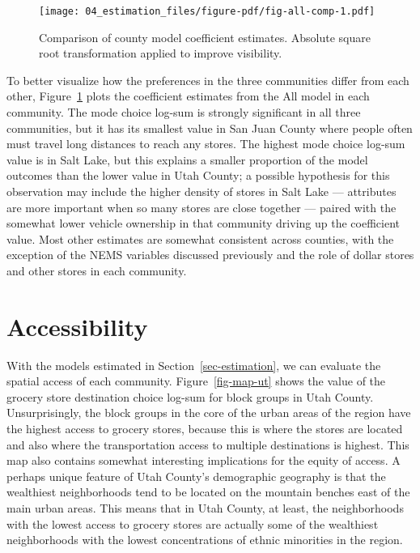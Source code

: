 \documentclass[
  letterpaper,
  DIV=11,
  numbers=noendperiod]{scrreport}
\begin{document}
\begin{figure}[t]

{\centering \texttt{[image: 04\_estimation\_files/figure-pdf/fig-all-comp-1.pdf]}

}

\caption{\label{fig-all-comp}Comparison of county model coefficient
estimates. Absolute square root transformation applied to improve
visibility.}

\end{figure}

To better visualize how the preferences in the three communities differ
from each other, Figure~\ref{fig-all-comp} plots the coefficient
estimates from the All model in each community. The mode choice log-sum
is strongly significant in all three communities, but it has its
smallest value in San Juan County where people often must travel long
distances to reach any stores. The highest mode choice log-sum value is
in Salt Lake, but this explains a smaller proportion of the model
outcomes than the lower value in Utah County; a possible hypothesis for
this observation may include the higher density of stores in Salt Lake
--- attributes are more important when so many stores are close together
--- paired with the somewhat lower vehicle ownership in that community
driving up the coefficient value. Most other estimates are somewhat
consistent across counties, with the exception of the NEMS variables
discussed previously and the role of dollar stores and other stores in
each community.

\hypertarget{sec-access}{%
\section{Accessibility}\label{sec-access}}

With the models estimated in Section~\ref{sec-estimation}, we can
evaluate the spatial access of each community. Figure~\ref{fig-map-ut}
shows the value of the grocery store destination choice log-sum for
block groups in Utah County. Unsurprisingly, the block groups in the
core of the urban areas of the region have the highest access to grocery
stores, because this is where the stores are located and also where the
transportation access to multiple destinations is highest. This map also
contains somewhat interesting implications for the equity of access. A
perhaps unique feature of Utah County's demographic geography is that
the wealthiest neighborhoods tend to be located on the mountain benches
east of the main urban areas. This means that in Utah County, at least,
the neighborhoods with the lowest access to grocery stores are actually
some of the wealthiest neighborhoods with the lowest concentrations of
ethnic minorities in the region.
\end{document}
